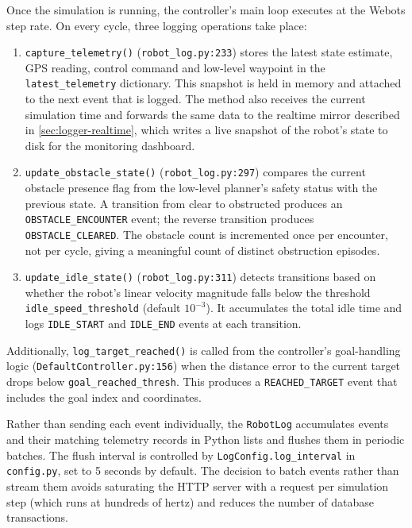 Once the simulation is running, the controller's main loop executes at the Webots step rate. On every cycle, three logging operations take place:

\begin{enumerate}[itemsep=0.4ex, topsep=0.6ex]
  \item \texttt{capture\_telemetry()} (\texttt{robot\_log.py:233}) stores the latest state estimate, GPS reading, control command and low-level waypoint in the \texttt{latest\_telemetry} dictionary. This snapshot is held in memory and attached to the next event that is logged. The method also receives the current simulation time and forwards the same data to the realtime mirror described in \cref{sec:logger-realtime}, which writes a live snapshot of the robot's state to disk for the monitoring dashboard.
  \item \texttt{update\_obstacle\_state()} (\texttt{robot\_log.py:297}) compares the current obstacle presence flag from the low-level planner's safety status with the previous state. A transition from clear to obstructed produces an \texttt{OBSTACLE\_ENCOUNTER} event; the reverse transition produces \texttt{OBSTACLE\_CLEARED}. The obstacle count is incremented once per encounter, not per cycle, giving a meaningful count of distinct obstruction episodes.
  \item \texttt{update\_idle\_state()} (\texttt{robot\_log.py:311}) detects transitions based on whether the robot's linear velocity magnitude falls below the threshold \texttt{idle\_speed\_threshold} (default $10^{-3}$). It accumulates the total idle time and logs \texttt{IDLE\_START} and \texttt{IDLE\_END} events at each transition.
\end{enumerate}

Additionally, \texttt{log\_target\_reached()} is called from the controller's goal-handling logic (\texttt{DefaultController.py:156}) when the distance error to the current target drops below \texttt{goal\_reached\_thresh}. This produces a \texttt{REACHED\_TARGET} event that includes the goal index and coordinates.

Rather than sending each event individually, the \texttt{RobotLog} accumulates events and their matching telemetry records in Python lists and flushes them in periodic batches. The flush interval is controlled by \texttt{LogConfig.log\_interval} in \texttt{config.py}, set to 5 seconds by default. The decision to batch events rather than stream them avoids saturating the HTTP server with a request per simulation step (which runs at hundreds of hertz) and reduces the number of database transactions.

